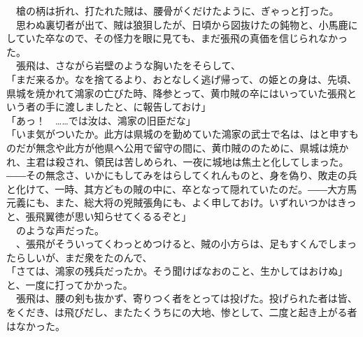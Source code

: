 \documentclass[
  paper=a5,
  fontsize=10pt,
  jafontsize=9.5pt,
  tate,                  %
  open_bracket_pos=nibu, %
]{jlreq}
\begin{document}
　槍の柄は折れ、打たれた賊は、腰骨がくだけたように、ぎゃっと打った。\\


　思わぬ裏切者が出て、賊は狼狽したが、日頃から図抜けたの鈍物と、小馬鹿にしていた卒なので、その怪力を眼に見ても、まだ張飛の真価を信じられなかった。\\


　張飛は、さながら岩壁のような胸いたをそらして、\\


「まだ来るか。なを捨てるより、おとなしく逃げ帰って、の姫との身は、先頃、県城を焼かれて鴻家の亡びた時、降参とって、黄巾賊の卒にはいっていた張飛という者の手に渡しましたと、に報告しておけ」\\


「あっ！　……では汝は、鴻家の旧臣だな」\\


「いま気がついたか。此方は県城のを勤めていた鴻家の武士で名は、はと申すものだが無念や此方が他県へ公用で留守の間に、黄巾賊ののために、県城は焼かれ、主君は殺され、領民は苦しめられ、一夜に城地は焦土と化してしまった。――その無念さ、いかにもしてみをはらしてくれんものと、身を偽り、敗走の兵と化けて、一時、其方どもの賊の中に、卒となって隠れていたのだ。――大方馬元義にも、また、総大将の兇賊張角にも、よく申しておけ。いずれいつかはきっと、張飛翼徳が思い知らせてくるるぞと」\\


　のような声だった。\\


　、張飛がそういってくわっとめつけると、賊の小方らは、足もすくんでしまったらしいが、まだ衆をたのんで、\\


「さては、鴻家の残兵だったか。そう聞けばなおのこと、生かしてはおけぬ」と、一度に打ってかかった。\\


　張飛は、腰の剣も抜かず、寄りつく者をとっては投げた。投げられた者は皆、をくだき、は飛びだし、またたくうちにの大地、惨として、二度と起き上がる者はなかった。\\
\end{document}
